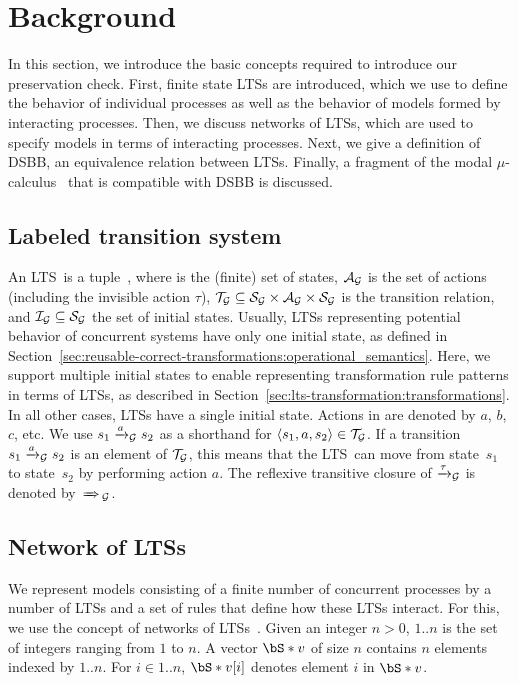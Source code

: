 \section{Background}
\label{sec:lts-transformation:background}
In this section, we introduce the basic concepts required to introduce our preservation check.
First, finite state LTSs are introduced, which we use to define the behavior of individual processes as well as the behavior of models formed by interacting processes.
Then, we discuss networks of LTSs, which are used to specify models in terms of interacting processes.
Next, we give a definition of DSBB, an equivalence relation between LTSs.
Finally, a fragment of the modal $\mu$-calculus~\cite{Kozen-83} that is compatible with DSBB is discussed.





\subsection{Labeled transition system}
An LTS~\graph is a tuple~\ltstuple{\graph}, where \states{\graph} is the (finite) set of states, ${\mathcal{A}_{\mathcal{G}}}$ is the set of actions (including the invisible action $\tau$), ${\mathcal{T}_{\mathcal{G}}} \subseteq {\mathcal{S}_{\ensuremath{\mathcal{G}}}} \times {\mathcal{A}_{\ensuremath{\mathcal{G}}}} \times {\mathcal{S}_{\ensuremath{\mathcal{G}}}}$ is the transition relation, and $\mathcal{I}_{\mathcal{G}} \subseteq {\mathcal{S}_{\ensuremath{\mathcal{G}}}}$ the set of initial states.
Usually, LTSs representing potential behavior of concurrent systems have only one initial state, as defined in Section~\ref{sec:reusable-correct-transformations:operational_semantics}.
Here, we support multiple initial states to enable representing transformation rule patterns in terms of LTSs, as described in Section~\ref{sec:lts-transformation:transformations}.
In all other cases, LTSs have a single initial state.
Actions in \actions{\graph} are denoted by $a$, $b$, $c$, etc.
We use $s_1 \xrightarrow{a}_\mathcal{G} s_2$ as a shorthand for $\langle s_1, a, s_2 \rangle \in {\mathcal{T}_{\ensuremath{\mathcal{G}}}}$.
If a transition $s_1 \xrightarrow{a}_\mathcal{G} s_2$ is an element of ${\mathcal{T}_{\mathcal{G}}}$, this means that the LTS~\graph can move from state~$s_1$ to state~$s_2$ by performing action $a$.
The reflexive transitive closure of $\xrightarrow{\tau}_\mathcal{G}$ is denoted by $\tausteps_\graph$.







\subsection{Network of LTSs}
We represent models consisting of a finite number of concurrent processes by a number of LTSs and a set of rules that define how these LTSs interact.
For this, we use the concept of networks of LTSs~\cite{lang05}.
Given an integer $n>0$, $1..n$ is the set of integers ranging from $1$ to $n$.
A vector $\vectornot{v}$ of size $n$ contains $n$ elements indexed by $1..n$. For $i \in 1..n$, $\vectornot{v}[i]$ denotes element $i$ in $\vectornot{v}$.
	
